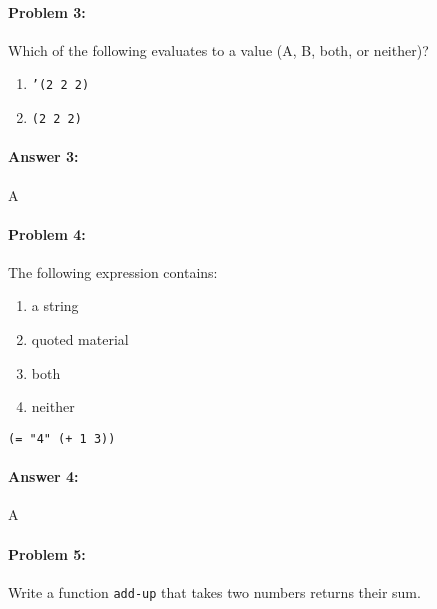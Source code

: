 \documentclass[10pt]{article}
\begin{document}
\noindent\hrulefill%

\paragraph{Problem 3:}
Which of the following evaluates to a value (A, B, both, or neither)?

\begin{enumerate}[nosep, label=\Alph*.]
  \item \texttt{'(2 2 2)}
  \item \texttt{(2 2 2)}
\end{enumerate}

\paragraph{Answer 3:} A

\noindent\hrulefill%

\paragraph{Problem 4:}
The following expression contains:
\begin{enumerate}[nosep, label=\Alph*.]
  \item a string
  \item quoted material
  \item both
  \item neither
\end{enumerate}

\begin{lstlisting}
(= "4" (+ 1 3))
\end{lstlisting}

\paragraph{Answer 4:} A
\hfill

\noindent\hrulefill%

\paragraph{Problem 5:}
Write a function \texttt{add-up} that takes two numbers returns their sum.
\end{document}
